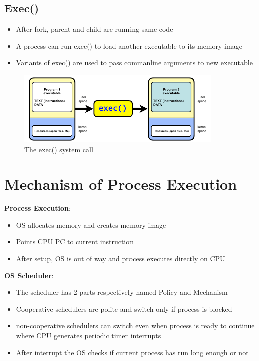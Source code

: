 \documentclass{article}
\begin{document}
\subsection{Exec()}
\begin{itemize}
    \item After fork, parent and child are running same code
    \item A process can run exec() to load another executable to its memory image
    \item Variants of exec() are used to pass commanline arguments to new executable
\end{itemize}
    \begin{figure}[ht]
     \centering
     \includegraphics[scale = 0.8]{img/exec().png}
     \caption{The exec() system call}
    \end{figure}

\section{Mechanism of Process Execution}
\textbf{Process Execution}: \\
\begin{itemize}
    \item OS allocates memory and creates memory image
    \item Points CPU PC to current instruction
    \item After setup, OS is out of way and process executes directly on CPU
\end{itemize}
\textbf{OS Scheduler}: \\
\begin{itemize}
    \item The scheduler has 2 parts respectively named Policy and Mechanism
    \item Cooperative schedulers are polite and switch only if process is blocked
    \item non-cooperative schedulers can switch even when process is ready to continue where CPU generates periodic timer interrupts
    \item After interrupt the OS checks if current process has run long enough or not
\end{itemize}
\end{document}
